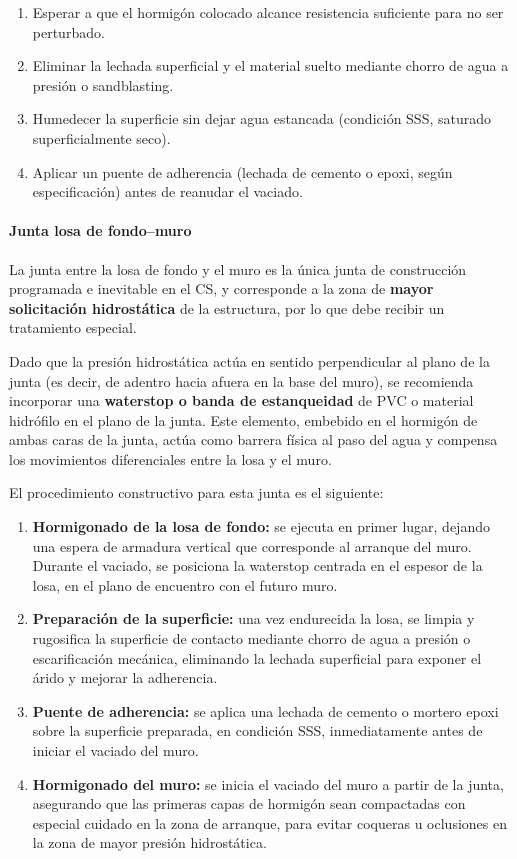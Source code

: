 \begin{enumerate}
    \item Esperar a que el hormigón colocado alcance resistencia suficiente para no ser perturbado.
    \item Eliminar la lechada superficial y el material suelto mediante chorro de agua a presión o sandblasting.
    \item Humedecer la superficie sin dejar agua estancada (condición SSS, saturado superficialmente seco).
    \item Aplicar un puente de adherencia (lechada de cemento o epoxi, según especificación) antes de reanudar el vaciado.
\end{enumerate}

\paragraph{Junta losa de fondo--muro}

La junta entre la losa de fondo y el muro es la única junta de construcción programada e inevitable en el CS, y corresponde a la zona de \textbf{mayor solicitación hidrostática} de la estructura, por lo que debe recibir un tratamiento especial.

Dado que la presión hidrostática actúa en sentido perpendicular al plano de la junta (es decir, de adentro hacia afuera en la base del muro), se recomienda incorporar una \textbf{waterstop o banda de estanqueidad} de PVC o material hidrófilo en el plano de la junta. Este elemento, embebido en el hormigón de ambas caras de la junta, actúa como barrera física al paso del agua y compensa los movimientos diferenciales entre la losa y el muro.

El procedimiento constructivo para esta junta es el siguiente:

\begin{enumerate}
    \item \textbf{Hormigonado de la losa de fondo:} se ejecuta en primer lugar, dejando una espera de armadura vertical que corresponde al arranque del muro. Durante el vaciado, se posiciona la waterstop centrada en el espesor de la losa, en el plano de encuentro con el futuro muro.
    \item \textbf{Preparación de la superficie:} una vez endurecida la losa, se limpia y rugosifica la superficie de contacto mediante chorro de agua a presión o escarificación mecánica, eliminando la lechada superficial para exponer el árido y mejorar la adherencia.
    \item \textbf{Puente de adherencia:} se aplica una lechada de cemento o mortero epoxi sobre la superficie preparada, en condición SSS, inmediatamente antes de iniciar el vaciado del muro.
    \item \textbf{Hormigonado del muro:} se inicia el vaciado del muro a partir de la junta, asegurando que las primeras capas de hormigón sean compactadas con especial cuidado en la zona de arranque, para evitar coqueras u oclusiones en la zona de mayor presión hidrostática.
\end{enumerate}

